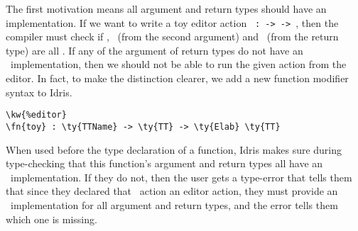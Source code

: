 The first motivation means all argument and return types should have an
 implementation. If we want to write a toy editor action
\texttt{ :  ->  ->  },
then the compiler must check if , \TT\ (from the second argument)
and \TT\ (from the return type) are all \Editorable. If any of the argument of
return types do not have an \Editorable\ implementation, then we should not be
able to run the given action from the editor. In fact, to make the distinction
clearer, we add a new function modifier syntax  to Idris.

\begin{Verbatim}[framesep=2mm, label=\footnotesize{\normalfont{Idris}}, labelposition=topline]
\kw{%editor}
\fn{toy} : \ty{TTName} -> \ty{TT} -> \ty{Elab} \ty{TT}
\end{Verbatim}

When used before the type declaration of a function, Idris makes sure during
type-checking that this function's argument and return types all have an
\Editorable\ implementation. If they do not, then the user gets a type-error
that tells them that since they declared that \Elab\ action an editor action,
they must provide an \Editorable\ implementation for all argument and return
types, and the error tells them which one is missing.

